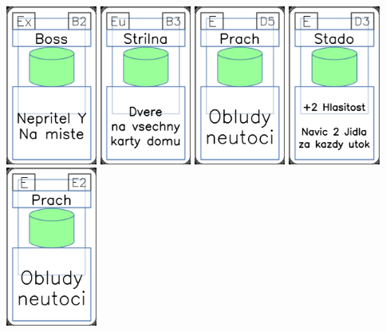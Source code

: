 \documentclass[a4paper]{article}
\begin{document}
	\includegraphics[width=3.0cm]{img-4_6}
	\includegraphics[width=3.0cm]{img-4_37}
	\includegraphics[width=3.0cm]{img-4_49}
	\includegraphics[width=3.0cm]{img-4_47}
	\includegraphics[width=3.0cm]{img-4_51}
\end{document}
